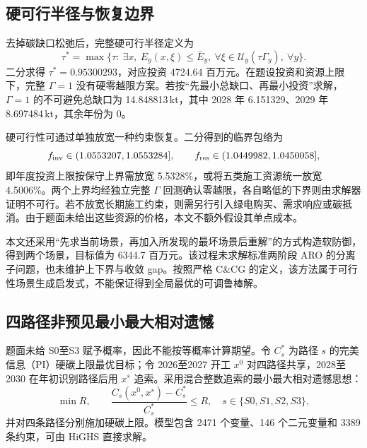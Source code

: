 \documentclass[UTF8,a4paper,zihao=-4,fontset=fandol]{ctexart}
\begin{document}
\subsection{硬可行半径与恢复边界}

去掉碳缺口松弛后，完整硬可行半径定义为
\begin{equation}
\tau^*=\max\bigl\{\tau:\ \exists x,\ E_y(x,\xi)\le\bar E_y,
\ \forall\xi\in\mathcal U_y(\tau\Gamma_y),\ \forall y\bigr\}.
\label{eq:taustar}
\end{equation}
二分求得 $\tau^*=0.95300293$，对应投资 4724.64 百万元。在题设投资和资源上限下，完整 $\Gamma=1$ 没有硬零越限方案。若按“先最小总缺口、再最小投资”求解，$\Gamma=1$ 的不可避免总缺口为 14.848813\,kt，其中 2028 年 6.151329、2029 年 8.697484\,kt，其余年份为 0。

硬可行性可通过单独放宽一种约束恢复。二分得到的临界包络为
\begin{equation}
f_{\rm inv}\in(1.0553207,1.0553284],\qquad
f_{\rm res}\in(1.0449982,1.0450058],
\label{eq:restore}
\end{equation}
即年度投资上限按保守上界需放宽 5.5328\%，或将五类施工资源统一放宽 4.5006\%。两个上界均经独立完整 $\Gamma$ 回测确认零越限，各自略低的下界则由求解器证明不可行。若不放宽长期施工约束，则需另行引入绿电购买、需求响应或碳抵消。由于题面未给出这些资源的价格，本文不额外假设其单点成本。

本文还采用“先求当前场景，再加入所发现的最坏场景后重解”的方式构造软防御，得到两个场景，目标值为 6344.7 百万元。该过程未求解标准两阶段 ARO 的分离子问题，也未维护上下界与收敛 gap。按照严格 C\&CG 的定义\cite{Zeng2013solving}，该方法属于可行性场景生成启发式，不能保证得到全局最优的可调鲁棒解。

\subsection{四路径非预见最小最大相对遗憾}

题面未给 S0至S3 赋予概率，因此不能按等概率计算期望。令 $C_s^*$ 为路径 $s$ 的完美信息（PI）硬碳上限最优目标；令 2026至2027 开工 $x^0$ 对四路径共享，2028至2030 在年初识别路径后用 $x^s$ 追索。采用混合整数追索的最小最大相对遗憾思想\cite{BenTal2004adjustable,Barkom2025regret}：
\begin{equation}
\min R,\qquad
\frac{C_s(x^0,x^s)-C_s^*}{C_s^*}\le R,
\quad s\in\{S0,S1,S2,S3\},
\label{eq:regret}
\end{equation}
并对四条路径分别施加硬碳上限。模型包含 2471 个变量、146 个二元变量和 3389 条约束，可由 HiGHS 直接求解。
\end{document}
